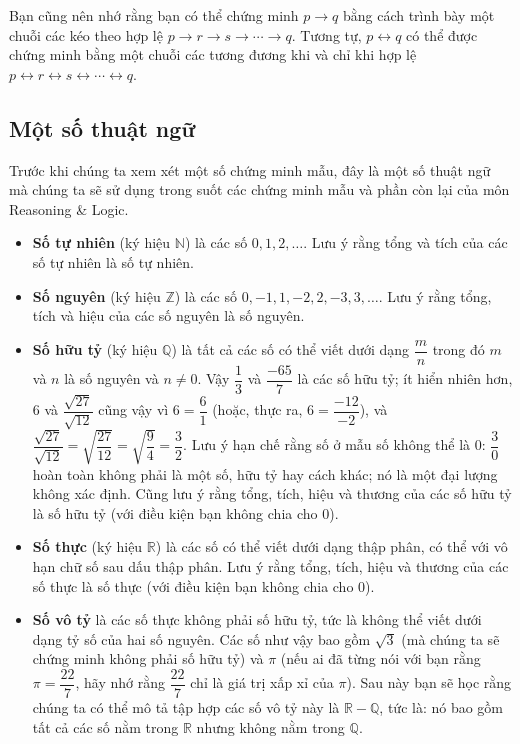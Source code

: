 Bạn cũng nên nhớ rằng bạn có thể chứng minh $p \to q$ bằng cách trình bày một chuỗi các kéo theo hợp lệ $p \to r \to s \to \cdots \to q$. Tương tự, $p \leftrightarrow q$ có thể được chứng minh bằng một chuỗi các tương đương khi và chỉ khi hợp lệ $p \leftrightarrow r \leftrightarrow s \leftrightarrow \cdots \leftrightarrow q$.

\subsection{Một số thuật ngữ}

Trước khi chúng ta xem xét một số chứng minh mẫu, đây là một số thuật ngữ mà chúng ta sẽ sử dụng trong suốt các chứng minh mẫu và phần còn lại của môn Reasoning \& Logic.
\begin{itemize}
\item \textbf{Số tự nhiên} (ký hiệu $\mathbb{N}$) là các số $0, 1, 2, \ldots$. Lưu ý rằng tổng và tích của các số tự nhiên là số tự nhiên.

\item \textbf{Số nguyên} (ký hiệu $\mathbb{Z}$) là các số $0, -1, 1, -2, 2, -3, 3, \ldots$. Lưu ý rằng tổng, tích và hiệu của các số nguyên là số nguyên.

\item \textbf{Số hữu tỷ} (ký hiệu $\mathbb{Q}$) là tất cả các số có thể viết dưới dạng $\dfrac{m}{n}$ trong đó $m$ và $n$ là số nguyên và $n \neq 0$. Vậy $\dfrac{1}{3}$ và $\dfrac{-65}{7}$ là các số hữu tỷ; ít hiển nhiên hơn, $6$ và $\dfrac{\sqrt{27}}{\sqrt{12}}$ cũng vậy vì $6 = \dfrac{6}{1}$ (hoặc, thực ra, $6 = \dfrac{-12}{-2}$), và $\dfrac{\sqrt{27}}{\sqrt{12}} = \sqrt{\dfrac{27}{12}} = \sqrt{\dfrac{9}{4}} = \dfrac{3}{2}$. Lưu ý hạn chế rằng số ở mẫu số không thể là $0$: $\dfrac{3}{0}$ hoàn toàn không phải là một số, hữu tỷ hay cách khác; nó là một đại lượng không xác định. Cũng lưu ý rằng tổng, tích, hiệu và thương của các số hữu tỷ là số hữu tỷ (với điều kiện bạn không chia cho $0$).

\item \textbf{Số thực} (ký hiệu $\mathbb{R}$) là các số có thể viết dưới dạng thập phân, có thể với vô hạn chữ số sau dấu thập phân. Lưu ý rằng tổng, tích, hiệu và thương của các số thực là số thực (với điều kiện bạn không chia cho $0$).

\item \textbf{Số vô tỷ} là các số thực không phải số hữu tỷ, tức là không thể viết dưới dạng tỷ số của hai số nguyên. Các số như vậy bao gồm $\sqrt{3}$ (mà chúng ta sẽ chứng minh không phải số hữu tỷ) và $\pi$ (nếu ai đã từng nói với bạn rằng $\pi = \dfrac{22}{7}$, hãy nhớ rằng $\dfrac{22}{7}$ chỉ là giá trị xấp xỉ của $\pi$). Sau này bạn sẽ học rằng chúng ta có thể mô tả tập hợp các số vô tỷ này là $\mathbb{R} - \mathbb{Q}$, tức là: nó bao gồm tất cả các số nằm trong $\mathbb{R}$ nhưng không nằm trong $\mathbb{Q}$.


\end{itemize}

